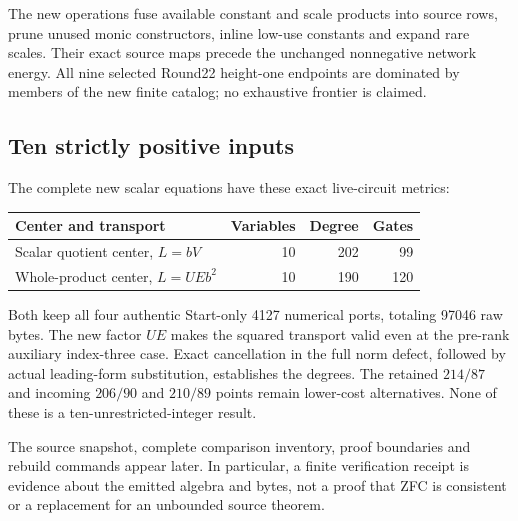 The new operations fuse available constant and scale products into source
rows, prune unused monic constructors, inline low-use constants and expand
rare scales. Their exact source maps precede the unchanged nonnegative
network energy. All nine selected Round22 height-one endpoints are dominated
by members of the new finite catalog; no exhaustive frontier is claimed.

\subsection{Ten strictly positive inputs}
The complete new scalar equations have these exact live-circuit metrics:
\begin{center}\small
\begin{tabular}{@{}lrrr@{}}\toprule
Center and transport & Variables & Degree & Gates\\\midrule
Scalar quotient center, $L=bV$ &10&202&99\\
Whole-product center, $L=UEb^2$ &10&190&120\\\bottomrule
\end{tabular}
\end{center}
Both keep all four authentic Start-only 4127 numerical ports, totaling
97046 raw bytes. The new factor $UE$ makes the squared transport valid even
at the pre-rank auxiliary index-three case. Exact cancellation in the full
norm defect, followed by actual leading-form substitution, establishes the
degrees. The retained $214/87$ and incoming $206/90$ and $210/89$ points
remain lower-cost alternatives. None of these is a ten-unrestricted-integer
result.

The source snapshot, complete comparison inventory, proof boundaries and
rebuild commands appear later. In particular, a finite verification receipt
is evidence about the emitted algebra and bytes, not a proof that ZFC is
consistent or a replacement for an unbounded source theorem.
